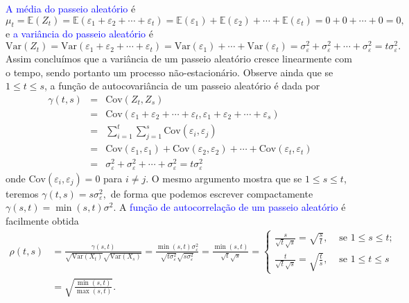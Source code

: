 \documentclass[
]{book}
\theoremstyle{definition}
\theoremstyle{definition}
\theoremstyle{definition}
\theoremstyle{remark}
\begin{document}
\textcolor{blue}{ A média do passeio aleatório } é
\[\mu_t= \mathbb{E}(Z_t) =\mathbb{E}(\varepsilon_1 + \varepsilon_2 +\cdots+ \varepsilon_t )= \mathbb{E} (\varepsilon_1 ) + \mathbb{E} (\varepsilon_2 ) +\cdots + \mathbb{E} (\varepsilon_t)= 0 + 0 + \cdots + 0 = 0,\]
e \textcolor{blue}{ a variância do passeio aleatório } é
\[\mbox{Var}(Z_t) = \mbox{Var}(\varepsilon_1 + \varepsilon_2 + \cdots + \varepsilon_t ) = \mbox{Var}(\varepsilon_1) + \cdots + \mbox{Var}(\varepsilon_t) = \sigma_\varepsilon^2 + \sigma_\varepsilon^2 + \cdots + \sigma_\varepsilon^2 = t\sigma_\varepsilon^2.\]
Assim concluímos que a variância de um passeio aleatório cresce linearmente com o tempo, sendo portanto um processo não-estacionário. Observe ainda que se \(1\leq t\leq s\), a função de autocovariância de um passeio aleatório é dada por
\begin{eqnarray*}
\gamma(t,s) &=&  \mbox{Cov}(Z_t,Z_s)\\
            &=&  \mbox{Cov}(\varepsilon_1 + \varepsilon_2 + \cdots + \varepsilon_t, \varepsilon_1 + \varepsilon_2 + \cdots + \varepsilon_s)\\
            &=& \sum_{i=1}^t\sum_{j=1}^s \mbox{Cov}(\varepsilon_i,\varepsilon_j)\\
            &=&  \mbox{Cov}(\varepsilon_1,\varepsilon_1) + \mbox{Cov}(\varepsilon_2,\varepsilon_2)+ \cdots+ \mbox{Cov}(\varepsilon_t,\varepsilon_t)\\
            &=&  \sigma_\varepsilon^2 + \sigma_\varepsilon^2 + \cdots +\sigma_\varepsilon^2 = t\sigma_\varepsilon^2
\end{eqnarray*}
onde \(\mbox{Cov}(\varepsilon_i, \varepsilon_j)=0\) para \(i\neq j\). O mesmo argumento mostra que se \(1\leq s \leq t\), teremos \(\gamma(t,s)=s\sigma_\varepsilon^2,\) de forma que podemos escrever compactamente \(\gamma(s,t)=\min(s,t)\sigma^2\).
A \textcolor{blue}{ função de autocorrelação de um passeio aleatório } é facilmente obtida
\begin{align*}
\rho(t,s)&= \frac{\gamma(s,t)}{\sqrt{\mbox{Var}(X_t)}\sqrt{\mbox{Var}(X_s)}}=\frac{\min(s,t)\sigma_\varepsilon^2}{\sqrt{t\sigma_\varepsilon^2}\sqrt{s\sigma_\varepsilon^2}}=\frac{\min(s,t)}{\sqrt{t}\sqrt{s}}=\left\{\begin{array}{cc}
           \frac{s}{\sqrt{t}\sqrt{s}}=\sqrt{\frac{s}{t}}, & \mbox{ se } 1\leq s\leq t; \\
           \frac{t}{\sqrt{t}\sqrt{s}}=\sqrt{\frac{t}{s}}, & \mbox{ se } 1\leq t\leq s
         \end{array}
\right.\\
&=\sqrt{\frac{\min(s,t)}{\max(s,t)}}.
\end{align*}
\end{document}
